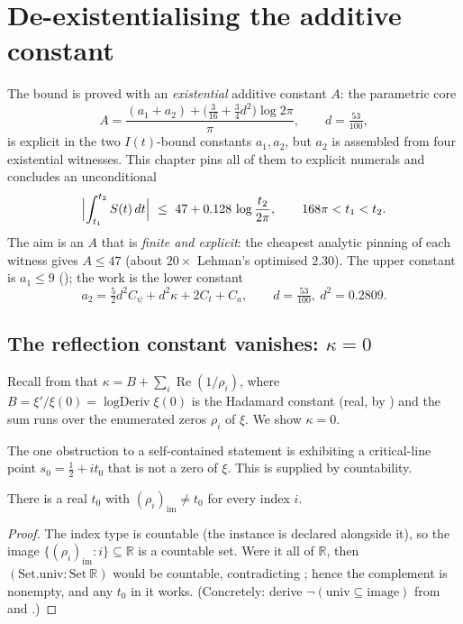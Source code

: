 
\chapter{De-existentialising the additive constant}
\label{cha:lehman_explicit}

The bound  is proved with an \emph{existential} additive constant
$A$: the parametric core
\[
  A=\frac{(a_1+a_2)+\bigl(\tfrac3{16}+\tfrac34 d^2\bigr)\log 2\pi}{\pi},
  \qquad d=\tfrac{53}{100},
\]
is explicit in the two $I(t)$-bound constants $a_1,a_2$, but $a_2$ is assembled from
four existential witnesses. This chapter pins all of them to explicit numerals and
concludes an unconditional
\[
  \Bigl|\int_{t_1}^{t_2}S(t)\,dt\Bigr|\ \le\ 47+0.128\,\log\frac{t_2}{2\pi},
  \qquad 168\pi<t_1<t_2 .
\]
The aim is an $A$ that is \emph{finite and explicit}: the cheapest analytic pinning of
each witness gives $A\le 47$ (about $20\times$ Lehman's optimised $2.30$). The upper
constant is $a_1\le 9$ (); the work is the lower
constant
\[
  a_2=\tfrac52 d^2 C_\psi+d^2\kappa+2C_t+C_a ,\qquad d=\tfrac{53}{100},\ d^2=0.2809 .
\tag{A2}
\]

\section{The reflection constant vanishes: \texorpdfstring{$\kappa=0$}{κ=0}}
\label{sec:le_kappa}

Recall from  that
$\kappa=B+\sum_i\operatorname{Re}(1/\rho_i)$, where $B=\xi'/\xi(0)=\operatorname{logDeriv}\xi(0)$
is the Hadamard constant (real, by )
and the sum runs over the enumerated zeros $\rho_i$ of $\xi$. We show $\kappa=0$.

The one obstruction to a self-contained statement is exhibiting a critical-line point
$s_0=\tfrac12+it_0$ that is not a zero of $\xi$. This is supplied by countability.

\begin{lemma}
\label{lem:le_good_ordinate}
\leanok
There is a real $t_0$ with $(\rho_i)_{\mathrm{im}}\ne t_0$ for every index $i$.
\end{lemma}

\begin{proof}
\leanok
The index type  is countable (the instance is declared
alongside it), so the image
$\{(\rho_i)_{\mathrm{im}} : i\}\subseteq\mathbb R$ is a countable set. Were it all of
$\mathbb R$, then $(\mathrm{Set.univ}:\mathrm{Set}\ \mathbb R)$ would be countable,
contradicting ; hence the complement is nonempty,
and any $t_0$ in it works. (Concretely: derive $\lnot(\mathrm{univ}\subseteq\mathrm{image})$
from  and .)
\end{proof}

